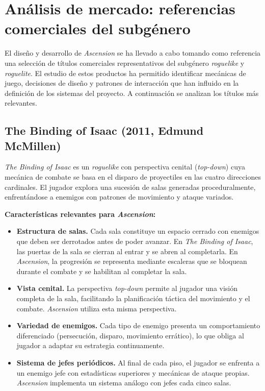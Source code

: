 \section{Análisis de mercado: referencias comerciales del subgénero}


El diseño y desarrollo de \textit{Ascension} se ha llevado a cabo tomando como referencia una selección de títulos comerciales representativos del subgénero \textit{roguelike} y \textit{roguelite}. El estudio de estos productos ha permitido identificar mecánicas de juego, decisiones de diseño y patrones de interacción que han influido en la definición de los sistemas del proyecto. A continuación se analizan los títulos más relevantes.

\subsection{The Binding of Isaac (2011, Edmund McMillen)}


\textit{The Binding of Isaac} es un \textit{roguelike} con perspectiva cenital (\textit{top-down}) cuya mecánica de combate se basa en el disparo de proyectiles en las cuatro direcciones cardinales. El jugador explora una sucesión de salas generadas proceduralmente, enfrentándose a enemigos con patrones de movimiento y ataque variados.

\textbf{Características relevantes para \textit{Ascension}:}
\begin{itemize}
\item \textbf{Estructura de salas.} Cada sala constituye un espacio cerrado con enemigos que deben ser derrotados antes de poder avanzar. En \textit{The Binding of Isaac}, las puertas de la sala se cierran al entrar y se abren al completarla. En \textit{Ascension}, la progresión se representa mediante escaleras que se bloquean durante el combate y se habilitan al completar la sala.
\item \textbf{Vista cenital.} La perspectiva \textit{top-down} permite al jugador una visión completa de la sala, facilitando la planificación táctica del movimiento y el combate. \textit{Ascension} utiliza esta misma perspectiva.
\item \textbf{Variedad de enemigos.} Cada tipo de enemigo presenta un comportamiento diferenciado (persecución, disparo, movimiento errático), lo que obliga al jugador a adaptar su estrategia continuamente.
\item \textbf{Sistema de jefes periódicos.} Al final de cada piso, el jugador se enfrenta a un enemigo jefe con estadísticas superiores y mecánicas de ataque propias. \textit{Ascension} implementa un sistema análogo con jefes cada cinco salas.
\end{itemize}

